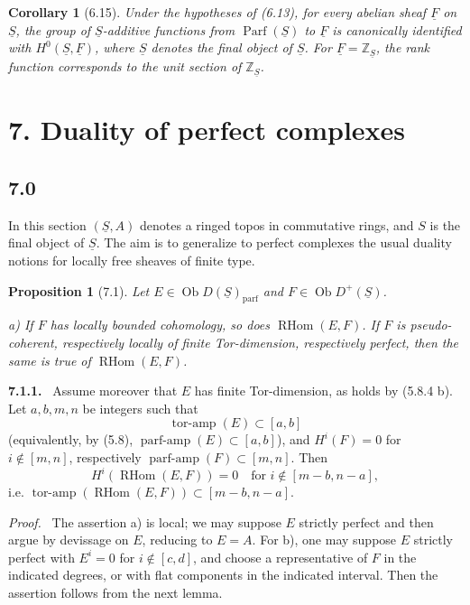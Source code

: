 \documentclass[11pt]{article}
\theoremstyle{plain}
\newtheorem*{proposition*}{Proposition}
\newtheorem*{corollary*}{Corollary}
\theoremstyle{definition}
\theoremstyle{remark}
\newenvironment{statement}[1]{\par\medskip\noindent\textbf{#1.}\ }{\par\medskip}
\newenvironment{prooftext}{\par\noindent\textit{Proof.}\ }{\par\medskip}
\newcommand{\ZZ}{\mathbb Z}
\DeclareMathOperator{\ob}{Ob}
\DeclareMathOperator{\RHom}{RHom}
\providecommand{\Parf}{\operatorname{Parf}}
\providecommand{\uF}{\underline{F}}
\providecommand{\uS}{\underline{S}}
\begin{document}
\begin{corollary*}[6.15]
Under the hypotheses of (6.13), for every abelian sheaf $\uF$ on $\uS$, the group of $\uS$-additive functions from $\Parf(\uS)$ to $\uF$ is canonically identified with $H^0(\uS,\uF)$, where $\uS$ denotes the final object of $\uS$. For $\uF=\ZZ_{\uS}$, the rank function corresponds to the unit section of $\ZZ_{\uS}$.
\end{corollary*}

\section*{7. Duality of perfect complexes}

\subsection*{7.0}
In this section $(\uS,A)$ denotes a ringed topos in commutative rings, and $S$ is the final object of $\uS$. The aim is to generalize to perfect complexes the usual duality notions for locally free sheaves of finite type.

\begin{proposition*}[7.1]
Let $E\in\ob D(\uS)_{\mathrm{parf}}$ and $F\in\ob D^+(\uS)$.

\textup{a)} If $F$ has locally bounded cohomology, so does $\RHom(E,F)$. If $F$ is pseudo-coherent, respectively locally of finite Tor-dimension, respectively perfect, then the same is true of $\RHom(E,F)$.
\end{proposition*}

\begin{statement}{7.1.1}
Assume moreover that $E$ has finite Tor-dimension, as holds by (5.8.4 b). Let $a,b,m,n$ be integers such that
\[
\operatorname{tor\text{-}amp}(E)\subset[a,b]
\]
(equivalently, by (5.8), $\operatorname{parf\text{-}amp}(E)\subset[a,b]$), and $H^i(F)=0$ for $i\notin[m,n]$, respectively $\operatorname{parf\text{-}amp}(F)\subset[m,n]$. Then
\[
H^i(\RHom(E,F))=0\quad\text{for }i\notin[m-b,n-a],
\]
i.e. $\operatorname{tor\text{-}amp}(\RHom(E,F))\subset[m-b,n-a]$.
\end{statement}

\begin{prooftext}
The assertion a) is local; we may suppose $E$ strictly perfect and then argue by devissage on $E$, reducing to $E=A$. For b), one may suppose $E$ strictly perfect with $E^i=0$ for $i\notin[c,d]$, and choose a representative of $F$ in the indicated degrees, or with flat components in the indicated interval. Then the assertion follows from the next lemma.
\end{prooftext}
\end{document}
